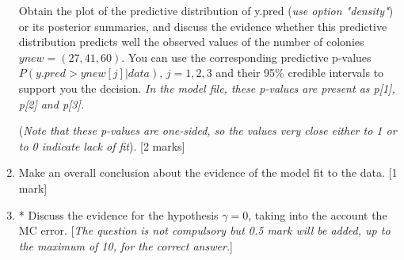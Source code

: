\documentclass[12pt]{report}
\begin{document}
\begin{enumerate}
  Obtain the plot of the predictive distribution of y.pred ({\it use option "density"}) or its posterior summaries, and discuss the evidence whether this predictive distribution predicts well the observed values of the number of colonies $ynew =(27,41,60)$. You can use the corresponding predictive p-values $P(y.pred > ynew[j] | data)$, $j=1,2,3$ and their 95\% credible intervals to support you the decision. {\it In the model file, these p-values are present as p[1], p[2] and p[3].}

 ({\it Note that these p-values are one-sided, so the values very close either to 1 or to 0 indicate lack of fit}).
[2 marks]

\item Make an overall conclusion about the evidence of the model fit to the data. [1 mark]

\item * Discuss the evidence for the hypothesis $\gamma =0 $, taking into the account the MC error. [{\it The question is not compulsory but 0.5 mark will be added, up to the maximum of 10, for the correct answer.}]

\end{enumerate}
\end{document}
